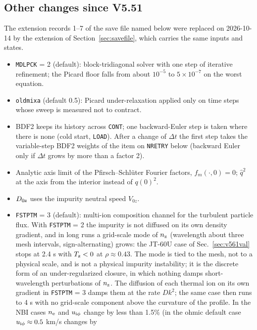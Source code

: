 \documentclass[11pt]{article}
\def\r#1{{\rm#1}}
\def\nee{n_\r{e}}
\begin{document}
\subsection{Other changes since V5.51}
\label{sec:v552other}

The extension records 1--7 of the save file named below were replaced on 2026-10-14 by the
extension of Section~\ref{sec:savefile}, which carries the same inputs and states.

\begin{itemize}
\item \texttt{MDLPCK} = 2 (default): block-tridiagonal solver with one step of
  iterative refinement; the Picard floor falls from about $10^{-5}$ to
  $5\times10^{-7}$ on the worst equation.
\item \texttt{oldmixa} (default 0.5): Picard under-relaxation applied only on
  time steps whose sweep is measured not to contract.
\item BDF2 keeps its history across \texttt{CONT}; one backward-Euler step is
  taken where there is none (cold start, \texttt{LOAD}).  After a change of $\Delta t$ the first
  step takes the variable-step BDF2 weights of the item on \texttt{NRETRY} below (backward Euler
  only if $\Delta t$ grows by more than a factor 2).
\item Analytic axis limit of the Pfirsch--Schl\"uter Fourier factors,
  $f_m(\cdot,0) = 0$; $\hat q^2$ at the axis from the interior instead of $q(0)^2$.
\item $D_{0\r{z}}$ uses the impurity neutral speed $V_{0z}$.
\item \texttt{FSTPTM} = 3 (default): multi-ion composition channel for the
  turbulent particle flux.  With \texttt{FSTPTM} = 2 the impurity is not diffused on
  its own density gradient, and in long runs a grid-scale mode of $n_\r{z}$ (wavelength
  about three mesh intervals, sign-alternating) grows: the JT-60U case of
  Sec.~\ref{sec:v561val} stops at 2.4 s with $T_\r{z} < 0$ at $\rho \approx 0.43$.  The mode
  is tied to the mesh, not to a physical scale, and is not a physical impurity
  instability; it is the discrete form of an under-regularized closure, in which nothing
  damps short-wavelength perturbations of $n_\r{z}$.  The diffusion of each thermal ion on
  its own gradient in \texttt{FSTPTM} = 3 damps them at the rate $D k^2$; the same case then
  runs to 4 s with no grid-scale component above the curvature of the profile.  In the NBI cases $\nee$ and $u_{\r{i}\phi}$ change
  by less than 1.5\% (in the ohmic default case $u_{\r{i}\phi} \approx 0.5$ km/s changes by

\end{itemize}
\end{document}
